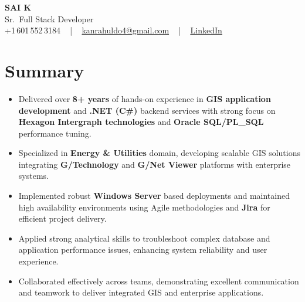 \documentclass[letterpaper,11pt]{article}
\newcommand{\resumeItem}[1]{
  \item\footnotesize{
    {#1 \vspace{-2pt}}
  }
}
\newcommand{\resumeItemListStart}{\begin{itemize}[leftmargin=*]}
\newcommand{\resumeItemListEnd}{\end{itemize}\vspace{-5pt}}
\begin{document}
\begin{center}
    {\fontsize{14pt}{12pt}\selectfont \textbf{\MakeUppercase{Sai K}}}\\ \vspace{2pt}
    \fontsize{10pt}{12pt}\selectfont Sr.\ Full Stack Developer\\ \vspace{2pt}
    \fontsize{10pt}{12pt}\selectfont +1\,601\,552\,3184 ~ | ~
    \href{mailto:kanrahuldo4@gmail.com}{kanrahuldo4@gmail.com} ~ | ~
    \href{https://www.linkedin.com/in/srrrk/}{\color{blue}\underline{LinkedIn}}
    \vspace{-10pt}
\end{center}

\section{Summary}
\fontsize{9pt}{10pt}\selectfont
\resumeItemListStart
  \resumeItem{Delivered over \textbf{8+ years} of hands-on experience in \textbf{GIS application development} and \textbf{.NET (C\#)} backend services with strong focus on \textbf{Hexagon Intergraph technologies} and \textbf{Oracle SQL/PL\_SQL} performance tuning.}
  \resumeItem{Specialized in \textbf{Energy \& Utilities} domain, developing scalable GIS solutions integrating \textbf{G/Technology} and \textbf{G/Net Viewer} platforms with enterprise systems.}
  \resumeItem{Implemented robust \textbf{Windows Server} based deployments and maintained high availability environments using Agile methodologies and \textbf{Jira} for efficient project delivery.}
  \resumeItem{Applied strong analytical skills to troubleshoot complex database and application performance issues, enhancing system reliability and user experience.}
  \resumeItem{Collaborated effectively across teams, demonstrating excellent communication and teamwork to deliver integrated GIS and enterprise applications.}
\resumeItemListEnd
\vspace{-6pt}

\end{document}
